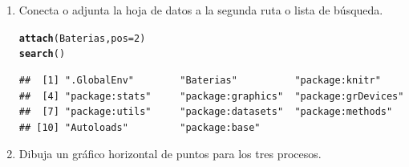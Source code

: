 \documentclass[12pt,letterpaper]{article}\usepackage[]{graphicx}\usepackage[]{color}
\makeatletter
\newcommand{\hlnum}[1]{\textcolor[rgb]{0.686,0.059,0.569}{#1}}%
\newcommand{\hlstd}[1]{\textcolor[rgb]{0.345,0.345,0.345}{#1}}%
\newcommand{\hlkwc}[1]{\textcolor[rgb]{0.333,0.667,0.333}{#1}}%
\newcommand{\hlkwd}[1]{\textcolor[rgb]{0.737,0.353,0.396}{\textbf{#1}}}%
\newenvironment{kframe}{%
 \def\at@end@of@kframe{}%
 \ifinner\ifhmode%
  \def\at@end@of@kframe{\end{minipage}}%
  \begin{minipage}{\columnwidth}%
 \fi\fi%
 \def\FrameCommand##1{\hskip\@totalleftmargin \hskip-\fboxsep
 \colorbox{shadecolor}{##1}\hskip-\fboxsep
     \hskip-\linewidth \hskip-\@totalleftmargin \hskip\columnwidth}%
 \MakeFramed {\advance\hsize-\width
   \@totalleftmargin\z@ \linewidth\hsize
   \@setminipage}}%
 {\par\unskip\endMakeFramed%
 \at@end@of@kframe}
\newenvironment{knitrout}{}{} %
\makeatother
\begin{document}
\begin{enumerate}
\item Conecta o adjunta la hoja de datos a la segunda ruta o lista de b\'usqueda.

\begin{knitrout}
\color{fgcolor}\begin{kframe}
\begin{alltt}
\hlkwd{attach}\hlstd{(Baterias,} \hlkwc{pos}\hlstd{=}\hlnum{2}\hlstd{)}
\hlkwd{search}\hlstd{()}
\end{alltt}
\begin{verbatim}
##  [1] ".GlobalEnv"        "Baterias"          "package:knitr"    
##  [4] "package:stats"     "package:graphics"  "package:grDevices"
##  [7] "package:utils"     "package:datasets"  "package:methods"  
## [10] "Autoloads"         "package:base"
\end{verbatim}
\end{kframe}
\end{knitrout}

\item Dibuja un gr\'afico horizontal de puntos para los tres procesos.


\end{enumerate}
\end{document}
